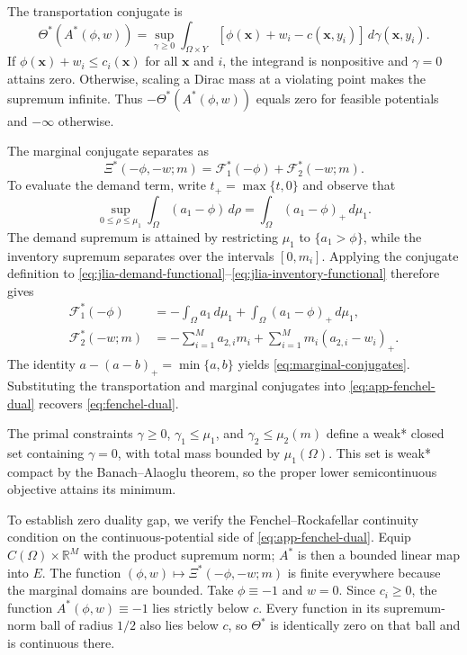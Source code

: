 \documentclass[a4paper,fleqn]{cas-sc}
\theoremstyle{remark}
\theoremstyle{plain}
\begin{document}
The transportation conjugate is
\begin{equation}\label{eq:app-transport-conjugate}
    \Theta^*(A^*(\phi,w))=\sup_{\gamma\ge0}\int_{\Omega\times Y}[\phi(\bm x)+w_i-c(\bm x,y_i)]\,d\gamma(\bm x,y_i).
\end{equation}
If $\phi(\bm x)+w_i\le c_i(\bm x)$ for all $\bm x$ and $i$, the integrand is nonpositive and $\gamma=0$ attains zero. Otherwise, scaling a Dirac mass at a violating point makes the supremum infinite. Thus $-\Theta^*(A^*(\phi,w))$ equals zero for feasible potentials and $-\infty$ otherwise.

The marginal conjugate separates as
\[
    \Xi^*(-\phi,-w;m)=\mathcal F_1^*(-\phi)+\mathcal F_2^*(-w;m).
\]
To evaluate the demand term, write $t_+=\max\{t,0\}$ and observe that
\[
    \sup_{0\le\rho\le\mu_1}\int_\Omega(a_1-\phi)\,d\rho=\int_\Omega(a_1-\phi)_+\,d\mu_1.
\]
The demand supremum is attained by restricting $\mu_1$ to $\{a_1>\phi\}$, while the inventory supremum separates over the intervals $[0,m_i]$. Applying the conjugate definition to \eqref{eq:jlia-demand-functional}--\eqref{eq:jlia-inventory-functional} therefore gives
\begin{align*}
    \mathcal F_1^*(-\phi)&=-\int_\Omega a_1\,d\mu_1+\int_\Omega(a_1-\phi)_+\,d\mu_1,\\
    \mathcal F_2^*(-w;m)&=-\sum_{i=1}^M a_{2,i}m_i+\sum_{i=1}^M m_i(a_{2,i}-w_i)_+.
\end{align*}
The identity $a-(a-b)_+=\min\{a,b\}$ yields \eqref{eq:marginal-conjugates}. Substituting the transportation and marginal conjugates into \eqref{eq:app-fenchel-dual} recovers \eqref{eq:fenchel-dual}.

The primal constraints $\gamma\ge0$, $\gamma_1\le\mu_1$, and $\gamma_2\le\mu_2(m)$ define a weak* closed set containing $\gamma=0$, with total mass bounded by $\mu_1(\Omega)$. This set is weak* compact by the Banach--Alaoglu theorem, so the proper lower semicontinuous objective attains its minimum.

To establish zero duality gap, we verify the Fenchel--Rockafellar continuity condition on the continuous-potential side of \eqref{eq:app-fenchel-dual}. Equip $C(\Omega)\times\mathbb R^M$ with the product supremum norm; $A^*$ is then a bounded linear map into $E$. The function $(\phi,w)\mapsto\Xi^*(-\phi,-w;m)$ is finite everywhere because the marginal domains are bounded. Take $\phi\equiv-1$ and $w=0$. Since $c_i\ge0$, the function $A^*(\phi,w)\equiv-1$ lies strictly below $c$. Every function in its supremum-norm ball of radius $1/2$ also lies below $c$, so $\Theta^*$ is identically zero on that ball and is continuous there.
\end{document}
